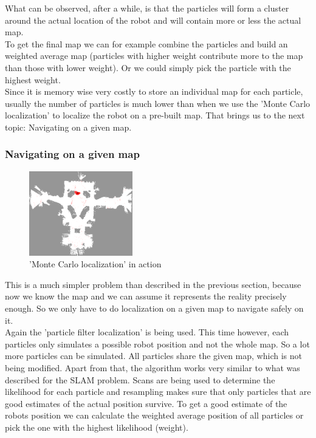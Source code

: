 \documentclass[a4paper,
  twoside, %
  headlines=2.1 %
  ]{scrartcl}
\begin{document}
What can be observed, after a while, is that the particles will form a cluster around the actual location of the robot and will contain more or less the actual map.\\
To get the final map we can for example combine the particles and build an weighted average map (particles with higher weight contribute more to the map than those with lower weight). Or we could simply pick the particle with the highest weight.\\
Since it is memory wise very costly to store an individual map for each particle, usually the number of particles is much lower than when we use the 'Monte Carlo localization' to localize the robot on a pre-built map. That brings us to the next topic: Navigating on a given map.


\subsubsection{Navigating on a given map}

\begin{figure} %
    \centering
    \includegraphics[width=0.4\textwidth]{monte_carlo_localization.png}
    \caption{'Monte Carlo localization' in action}
\end{figure}

This is a much simpler problem than described in the previous section, because now we know the map and we can assume it represents the reality precisely enough. So we only have to do localization on a given map to navigate safely on it.\\
Again the 'particle filter localization' is being used. This time however, each particles only simulates a possible robot position and not the whole map. So a lot more particles can be simulated. All particles share the given map, which is not being modified. Apart from that, the algorithm works very similar to what was described for the SLAM problem. Scans are being used to determine the likelihood for each particle and resampling makes sure that only particles that are good estimates of the actual position survive. To get a good estimate of the robots position we can calculate the weighted average position of all particles or pick the one with the highest likelihood (weight).
\end{document}
